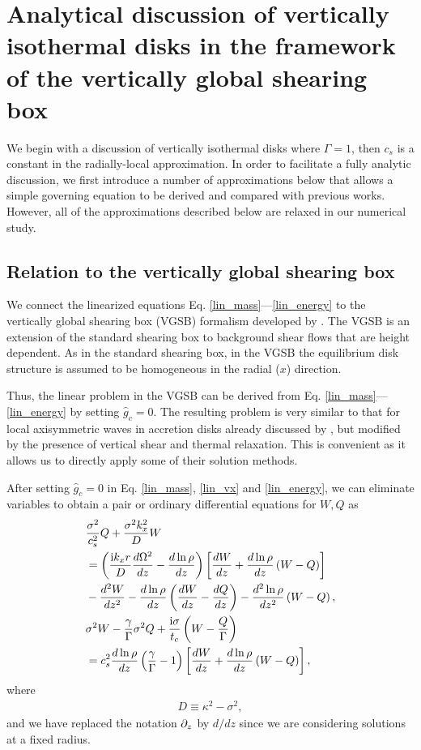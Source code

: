 \section{Analytical discussion of vertically isothermal
  disks in the framework of the vertically global shearing
  box}\label{analytical}  
We begin with a discussion of vertically isothermal disks
where $\Gamma=1$, then $c_s$ is a constant in the radially-local
approximation. 
In order to facilitate a fully analytic discussion, we first introduce a
number of approximations below that allows a simple governing equation
to be derived and compared with previous works.  However, all of the 
approximations described below are relaxed in our
numerical study.    

\subsection{Relation to the vertically global
  shearing box}\label{vgsb_approx} 
We connect the linearized equations 
Eq. \ref{lin_mass}---\ref{lin_energy} to the vertically global  
shearing box (VGSB) formalism developed by \cite{mcnally14}. The VGSB
is an extension of the standard shearing box \citep{goldreich65} to 
background shear flows that are height dependent. 
As in the  standard shearing box, in the VGSB the equilibrium disk
structure is assumed to be homogeneous in the radial ($x$) direction.  

Thus, the linear problem in the VGSB can be derived from
Eq. \ref{lin_mass}---\ref{lin_energy} by setting 
$\hat{g}_c=0$. The resulting problem is very similar 
to that for local axisymmetric waves in accretion disks already
discussed by \cite{lubow93}, but modified by the presence of vertical
shear and thermal relaxation. This is convenient as it allows us to
directly apply some of their solution methods.    

After setting $\hat{g}_c=0$ in Eq. \ref{lin_mass}, \ref{lin_vx} and
\ref{lin_energy}, we can eliminate variables 
to obtain a pair or ordinary differential
equations for $W,Q$ as
\begin{align}
  &\frac{\sigma^2}{c_s^2}Q + \frac{\sigma^2k_x^2}{D}W \notag\\ 
  &=\left(\frac{\mathrm{i}
      k_x r}{D}\frac{d\Omega^2}{dz} -
    \frac{d\ln{\rho}}{dz}\right)\left[\frac{dW}{dz} +
    \frac{d\ln{\rho}}{dz}\left(W-Q\right)\right] \notag\\
  &- \frac{d^2W}{dz^2} - \frac{d\ln{\rho}}{dz}\left(\frac{dW}{dz} -
    \frac{dQ}{dz}\right) - \frac{d^2\ln{\rho}}{dz^2}\left(W-Q\right),\label{ode_w}\\
  &\sigma^2W - \frac{\gamma}{\Gamma}\sigma^2 Q +
  \frac{\mathrm{i}\sigma}{t_c}\left(W-\frac{Q}{\Gamma}\right)\notag\\
  &=c_s^2\frac{d\ln{\rho}}{dz}\left(\frac{\gamma}{\Gamma} - 1\right) 
  \left[\frac{dW}{dz} + \frac{d\ln{\rho}}{dz}\left(W-Q\right)\right],\label{ode_Q} 
\end{align}
where
\begin{align}
  D \equiv \kappa^2 - \sigma^2,
\end{align} 
and we have replaced the notation $\partial_z$ by $d/dz$ since we are
considering solutions at a fixed radius. 

